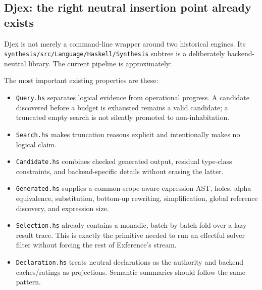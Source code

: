 \documentclass[11pt,oneside]{article}
\newcommand{\filepath}[1]{\nolinkurl{#1}}
\begin{document}
\subsection{Djex: the right neutral insertion point already exists}

Djex is not merely a command-line wrapper around two historical engines. Its
\filepath{synthesis/src/Language/Haskell/Synthesis} subtree is a deliberately
backend-neutral library. The current pipeline is approximately:

\begin{center}
\end{center}

The most important existing properties are these:

\begin{itemize}
  \item \filepath{Query.hs} separates logical evidence from operational progress.
        A candidate discovered before a budget is exhausted remains a valid candidate;
        a truncated empty search is not silently promoted to non-inhabitation.
  \item \filepath{Search.hs} makes truncation reasons explicit and intentionally makes
        no logical claim.
  \item \filepath{Candidate.hs} combines checked generated output, residual type-class
        constraints, and backend-specific details without erasing the latter.
  \item \filepath{Generated.hs} supplies a common scope-aware expression AST, holes,
        alpha equivalence, substitution, bottom-up rewriting, simplification, global
        reference discovery, and expression size.
  \item \filepath{Selection.hs} already contains a monadic, batch-by-batch fold over a
        lazy result trace. This is exactly the primitive needed to run an effectful
        solver filter without forcing the rest of Exference's stream.
  \item \filepath{Declaration.hs} treats neutral declarations as the authority and
        backend caches/ratings as projections. Semantic summaries should follow the
        same pattern.
\end{itemize}
\end{document}
